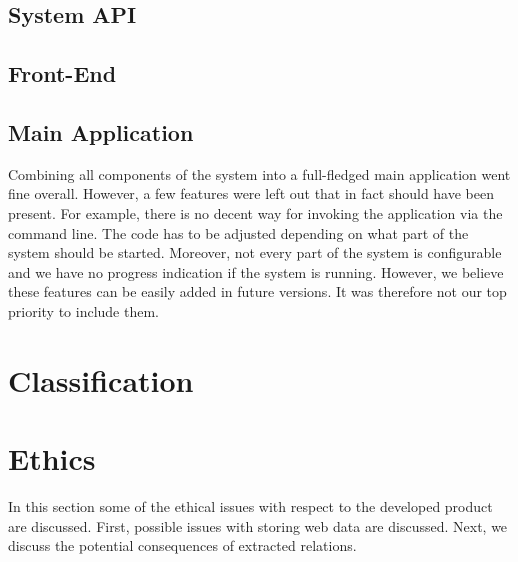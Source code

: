 \subsection{System API}
\subsection{Front-End}

\subsection{Main Application}
Combining all components of the system into a full-fledged main application went fine overall. However, a few features were left out that in fact should have been present. For example, there is no decent way for invoking the application via the command line. The code has to be adjusted depending on what part of the system should be started. Moreover, not every part of the system is configurable and we have no progress indication if the system is running. However, we believe these features can be easily added in future versions. It was therefore not our top priority to include them.



\section{Classification} \label{sec:discuss-classifier}

\section{Ethics}
In this section some of the ethical issues with respect to the developed product are discussed. First, possible issues with storing web data are discussed. Next, we discuss the potential consequences of extracted relations.

